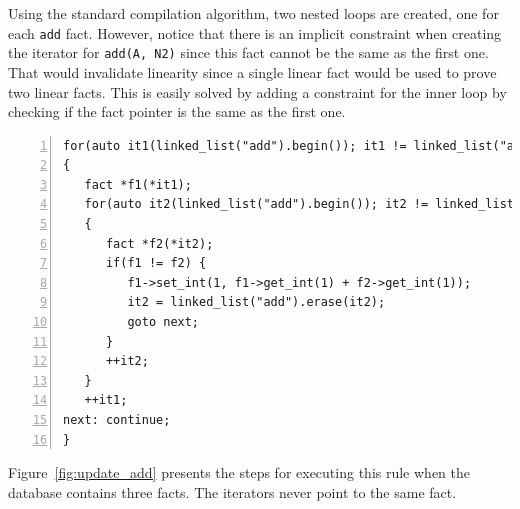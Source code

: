 Using the standard compilation algorithm, two nested loops are created, one for
each \texttt{add} fact. However, notice that there is an implicit constraint
when creating the iterator for \texttt{add(A, N2)} since this fact cannot be the
same as the first one. That would invalidate linearity since a single linear fact would
be used to prove two linear facts. This is easily solved by adding a constraint
for the inner loop by checking if the fact pointer is the same as the first one.

\begin{Verbatim}[numbers=left,fontsize=\scriptsize]
for(auto it1(linked_list("add").begin()); it1 != linked_list("add").end(); )
{
   fact *f1(*it1);
   for(auto it2(linked_list("add").begin()); it2 != linked_list("add").end(); )
   {
      fact *f2(*it2);
      if(f1 != f2) {
         f1->set_int(1, f1->get_int(1) + f2->get_int(1));
         it2 = linked_list("add").erase(it2);
         goto next;
      }
      ++it2;
   }
   ++it1;
next: continue;
}
\end{Verbatim}

Figure~\ref{fig:update_add} presents the steps for executing this rule when the
database contains three facts. The iterators never point to the same fact.

